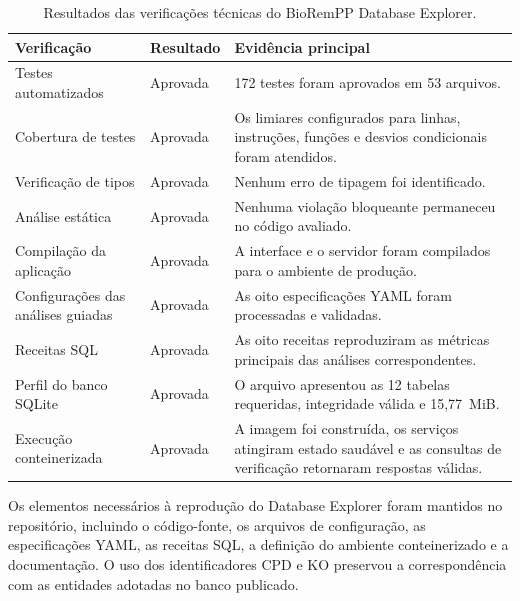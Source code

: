 \begin{table}[htbp]
\centering
\caption{Resultados das verificações técnicas do BioRemPP Database Explorer.}
\label{tab:c2-technical-verification}
\small
\begin{tabularx}{\textwidth}{@{}p{4.1cm}p{2.3cm}X@{}}
\toprule
\textbf{Verificação}
& \textbf{Resultado}
& \textbf{Evidência principal} \\
\midrule

Testes automatizados
& Aprovada
& 172 testes foram aprovados em 53 arquivos. \\

Cobertura de testes
& Aprovada
& Os limiares configurados para linhas, instruções, funções e desvios
condicionais foram atendidos. \\

Verificação de tipos
& Aprovada
& Nenhum erro de tipagem foi identificado. \\

Análise estática
& Aprovada
& Nenhuma violação bloqueante permaneceu no código avaliado. \\

Compilação da aplicação
& Aprovada
& A interface e o servidor foram compilados para o ambiente de produção. \\

Configurações das análises guiadas
& Aprovada
& As oito especificações YAML foram processadas e validadas. \\

Receitas SQL
& Aprovada
& As oito receitas reproduziram as métricas principais das análises
correspondentes. \\

Perfil do banco SQLite
& Aprovada
& O arquivo apresentou as 12 tabelas requeridas, integridade válida e
15,77~MiB. \\

Execução conteinerizada
& Aprovada
& A imagem foi construída, os serviços atingiram estado saudável e as
consultas de verificação retornaram respostas válidas. \\

\bottomrule
\end{tabularx}
\end{table}


Os elementos necessários à reprodução do Database Explorer foram mantidos no
repositório, incluindo o código-fonte, os arquivos de configuração, as
especificações YAML, as receitas SQL, a definição do ambiente conteinerizado e
a documentação. O uso dos identificadores CPD e KO preservou a
correspondência com as entidades adotadas no banco publicado.

